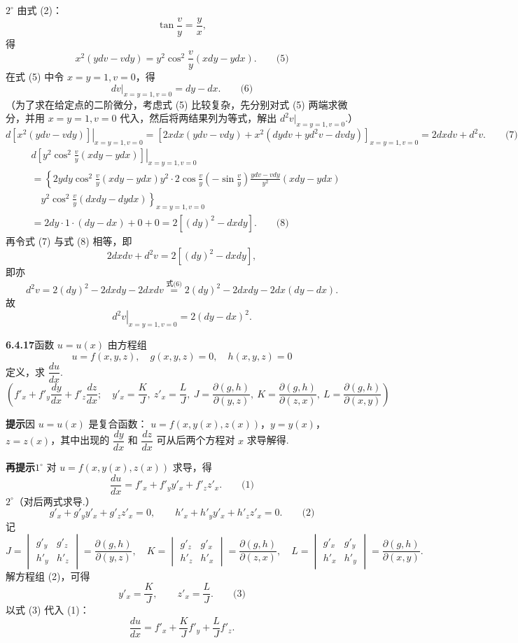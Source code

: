 \documentclass[UTF8, 12pt, fontset=fandol, oneside]{ctexart}
\begin{document}
$2^\circ$ 由式 (2)：
\[
  \tan\frac vy=\frac yx,
\]
得
\[
  x^2(ydv-vdy)=y^2\cos^2\frac vy(xdy-ydx). \qquad\text{(5)}
\]
在式 (5) 中令 $x=y=1,v=0$，得
\[
  \left.dv\right|_{x=y=1,v=0}=dy-dx. \qquad\text{(6)}
\]
（为了求在给定点的二阶微分，考虑式 (5) 比较复杂，先分别对式 (5) 两端求微分，并用 $x=y=1,v=0$ 代入，然后将两结果列为等式，解出 $d^2v|_{x=y=1,v=0}$.）
\[
\left.d[x^2(ydv-vdy)]\right|_{x=y=1,v=0}
=
\left[2xdx(ydv-vdy)+x^2(dydv+yd^2v-dvdy)\right]_{x=y=1,v=0}
=2dxdv+d^2v. \qquad\text{(7)}
\]
\[
\begin{aligned}
&\left.d\left[y^2\cos^2\frac vy(xdy-ydx)\right]\right|_{x=y=1,v=0}\\
&=\left\{2ydy\cos^2\frac vy(xdy-ydx)
y^2\cdot 2\cos\frac vy\left(-\sin\frac vy\right)
\frac{ydv-vdy}{y^2}(xdy-ydx)\right.\\
&\quad\left.
y^2\cos^2\frac vy(dxdy-dydx)\right\}_{x=y=1,v=0}\\
&=2dy\cdot1\cdot(dy-dx)+0+0
=2[(dy)^2-dxdy]. \qquad\text{(8)}
\end{aligned}
\]
再令式 (7) 与式 (8) 相等，即
\[
  2dxdv+d^2v=2[(dy)^2-dxdy],
\]
即亦
\[
  d^2v=2(dy)^2-2dxdy-2dxdv
  \overset{\text{式(6)}}{=}
  2(dy)^2-2dxdy-2dx(dy-dx).
\]
故
\[
  \left.d^2v\right|_{x=y=1,v=0}=2(dy-dx)^2.
\]

\noindent\textbf{6.4.17}\quad 函数 $u=u(x)$ 由方程组
\[
  u=f(x,y,z),\quad g(x,y,z)=0,\quad h(x,y,z)=0
\]
定义，求 $\dfrac{du}{dx}$.
\[
  \left(f'_x+f'_y\frac{dy}{dx}+f'_z\frac{dz}{dx};\quad
  y'_x=\frac KJ,\ z'_x=\frac LJ,\ 
  J=\frac{\partial(g,h)}{\partial(y,z)},\
  K=\frac{\partial(g,h)}{\partial(z,x)},\
  L=\frac{\partial(g,h)}{\partial(x,y)}
  \right)
\]

\noindent\textbf{提示}\quad 因 $u=u(x)$ 是复合函数：
$u=f(x,y(x),z(x))$，$y=y(x)$，$z=z(x)$，其中出现的
$\dfrac{dy}{dx}$ 和 $\dfrac{dz}{dx}$ 可从后两个方程对 $x$ 求导解得.

\noindent\textbf{再提示}\quad $1^\circ$ 对 $u=f(x,y(x),z(x))$ 求导，得
\[
  \frac{du}{dx}=f'_x+f'_y y'_x+f'_z z'_x. \qquad\text{(1)}
\]
$2^\circ$（对后两式求导.）
\[
  g'_x+g'_y y'_x+g'_z z'_x=0,\qquad
  h'_x+h'_y y'_x+h'_z z'_x=0. \qquad\text{(2)}
\]
记
\[
  J=
  \begin{vmatrix}
    g'_y&g'_z\\
    h'_y&h'_z
  \end{vmatrix}
  =
  \frac{\partial(g,h)}{\partial(y,z)},\quad
  K=
  \begin{vmatrix}
    g'_z&g'_x\\
    h'_z&h'_x
  \end{vmatrix}
  =
  \frac{\partial(g,h)}{\partial(z,x)},\quad
  L=
  \begin{vmatrix}
    g'_x&g'_y\\
    h'_x&h'_y
  \end{vmatrix}
  =
  \frac{\partial(g,h)}{\partial(x,y)}.
\]
解方程组 (2)，可得
\[
  y'_x=\frac KJ,\qquad z'_x=\frac LJ. \qquad\text{(3)}
\]
以式 (3) 代入 (1)：
\[
  \frac{du}{dx}=f'_x+\frac KJ f'_y+\frac LJ f'_z.
\]
\end{document}
